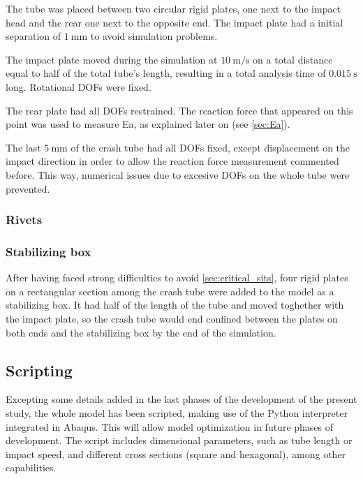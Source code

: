 The tube was placed between two circular rigid plates, one next to the impact head and the rear one next to the opposite end. The impact plate had a initial separation of $\SI{1}{\mm}$ to avoid simulation problems.

The impact plate moved during the simulation at $\SI{10}{\m/\s}$ on a total distance equal to half of the total tube's length, resulting in a total analysis time of $\SI{0.015}{\s}$ long. Rotational \glspl{DOF} were fixed.

The rear plate had all \glspl{DOF} restrained. The reaction force that appeared on this point was used to measure \gls{Ea}, as explained later on (see \ref{sec:Ea}).

The last $\SI{5}{\mm}$ of the crash tube had all \glspl{DOF} fixed, except displacement on the impact direction in order to allow the reaction force measurement commented before. This way, numerical issues due to excesive \glspl{DOF} on the whole tube were prevented.

\subsubsection{Rivets}

\subsubsection{Stabilizing box}

After having faced strong difficulties to avoid \ref{sec:critical_sits}, four rigid plates on a rectangular section among the crash tube were added to the model as a stabilizing box. It had half of the length of the tube and moved toghether with the impact plate, so the crash tube would end confined between the plates on both ends and the stabilizing box by the end of the simulation.


\subsection{Scripting}

Excepting some details added in the last phases of the development of the present study, the whole model has been scripted, making use of the Python interpreter integrated in Abaqus. This will allow model optimization in future phases of development. The script includes dimensional parameters, such as tube length or impact speed, and different cross sections (square and hexagonal), among other capabilities.

